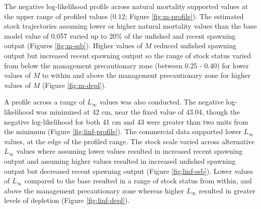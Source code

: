 \documentclass[11pt,
  english,
  a4paper,
]{article}
\begin{document}
\leavevmode\tagmcend\tagstructend\par


The negative log-likelihood profile across natural mortality supported values at the upper range of profiled values (0.12; Figure \ref{fig:m-profile}). The estimated stock trajectories assuming lower or higher natural mortality values than the base model value of 0.057 varied up to 20\% of the unfished and recent spawning output (Figures \ref{fig:m-ssb}). Higher values of {\(M\)\leavevmode\tagmcend\tagstructend} reduced unfished spawning output but increased recent spawning output so the range of stock status varied from below the management precautionary zone (between 0.25 - 0.40) for lower values of {\(M\)\leavevmode\tagmcend\tagstructend} to within and above the management precautionary zone for higher values of {\(M\)\leavevmode\tagmcend\tagstructend} (Figure \ref{fig:m-depl}).

\leavevmode\tagmcend\tagstructend\par


A profile across a range of {\(L_{\infty}\)\leavevmode\tagmcend\tagstructend} values was also conducted. The negative log-likelihood was minimized at 42 cm, near the fixed value of 43.04, though the negative log-likelihood for both 41 cm and 43 were greater than two units from the minimum (Figure \ref{fig:linf-profile}). The commercial data supported lower {\(L_{\infty}\)\leavevmode\tagmcend\tagstructend} values, at the edge of the profiled range. The stock scale varied across alternative {\(L_{\infty}\)\leavevmode\tagmcend\tagstructend} values where assuming lower values resulted in increased recent spawning output and assuming higher values resulted in increased unfished spawning output but decreased recent spawning output (Figure \ref{fig:linf-ssb}). Lower values of {\(L_{\infty}\)\leavevmode\tagmcend\tagstructend} compared to the base resulted in a range of stock status from within, and above the management precautionary zone whereas higher {\(L_{\infty}\)\leavevmode\tagmcend\tagstructend} resulted in greater levels of depletion (Figure \ref{fig:linf-depl}).
\end{document}
